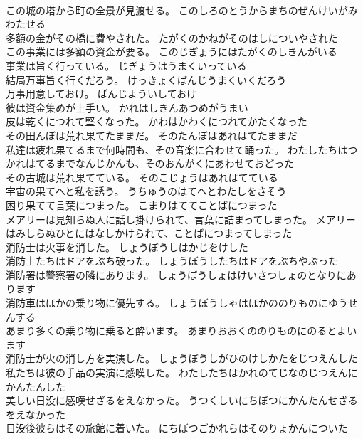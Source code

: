 \documentclass[8pt]{extreport}
\begin{document}
\begin{CJK}{UTF8}{min}
\\	この城の塔から町の全景が見渡せる。	このしろのとうからまちのぜんけいがみわたせる 
\\	多額の金がその橋に費やされた。	たがくのかねがそのはしについやされた 
\\	この事業には多額の資金が要る。	このじぎょうにはたがくのしきんがいる 
\\	事業は旨く行っている。	じぎょうはうまくいっている 
\\	結局万事旨く行くだろう。	けっきょくばんじうまくいくだろう 
\\	万事用意しておけ。	ばんじよういしておけ 
\\	彼は資金集めが上手い。	かれはしきんあつめがうまい 
\\	皮は乾くにつれて堅くなった。	かわはかわくにつれてかたくなった 
\\	その田んぼは荒れ果てたままだ。	そのたんぼはあれはてたままだ 
\\	私達は疲れ果てるまで何時間も、その音楽に合わせて踊った。	わたしたちはつかれはてるまでなんじかんも、そのおんがくにあわせておどった 
\\	その古城は荒れ果てている。	そのこじょうはあれはてている 
\\	宇宙の果てへと私を誘う。	うちゅうのはてへとわたしをさそう 
\\	困り果てて言葉につまった。	こまりはててことばにつまった 
\\	メアリーは見知らぬ人に話し掛けられて、言葉に詰まってしまった。	メアリーはみしらぬひとにはなしかけられて、ことばにつまってしまった 
\\	消防士は火事を消した。	しょうぼうしはかじをけした 
\\	消防士たちはドアをぶち破った。	しょうぼうしたちはドアをぶちやぶった 
\\	消防署は警察署の隣にあります。	しょうぼうしょはけいさつしょのとなりにあります 
\\	消防車はほかの乗り物に優先する。	しょうぼうしゃはほかののりものにゆうせんする 
\\	あまり多くの乗り物に乗ると酔います。	あまりおおくののりものにのるとよいます 
\\	消防士が火の消し方を実演した。	しょうぼうしがひのけしかたをじつえんした 
\\	私たちは彼の手品の実演に感嘆した。	わたしたちはかれのてじなのじつえんにかんたんした 
\\	美しい日没に感嘆せざるをえなかった。	うつくしいにちぼつにかんたんせざるをえなかった 
\\	日没後彼らはその旅館に着いた。	にちぼつごかれらはそのりょかんについた 

\end{CJK}
\end{document}
